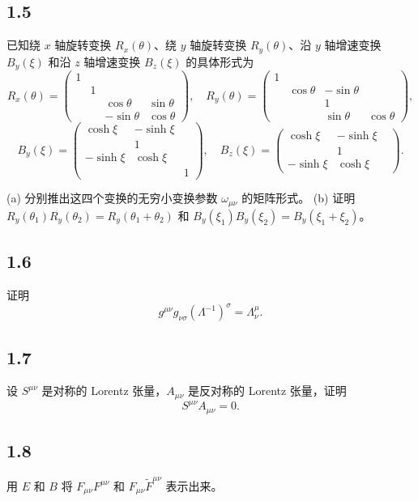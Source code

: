 \subsection{1.5}
已知绕 $x$ 轴旋转变换 $R_x(\theta)$、绕 $y$ 轴旋转变换 $R_y(\theta)$、沿 $y$ 轴增速变换 $B_y(\xi)$ 和沿 $z$ 轴增速变换 $B_z(\xi)$ 的具体形式为
$$R_x(\theta) =
\begin{pmatrix}
1 & & \\
& 1 & \\
& & \cos\theta & \sin\theta \\
& & -\sin\theta & \cos\theta 
\end{pmatrix},
\quad R_y(\theta) =
\begin{pmatrix}
1 & & \\
& \cos\theta & -\sin\theta \\
& & 1 \\
& & \sin\theta & \cos\theta 
\end{pmatrix},$$
$$B_y(\xi) =
\begin{pmatrix}
\cosh\xi & -\sinh\xi \\
& 1 & \\
-\sinh\xi & \cosh\xi \\
& & 1 
\end{pmatrix},
\quad B_z(\xi) =
\begin{pmatrix}
\cosh\xi & -\sinh\xi \\
& 1 & \\
-\sinh\xi & \cosh\xi 
\end{pmatrix}.$$

(a) 分别推出这四个变换的无穷小变换参数 $\omega_{\mu\nu}$ 的矩阵形式。
(b) 证明 $R_y(\theta_1)R_y(\theta_2) = R_y(\theta_1 + \theta_2)$ 和 $B_y(\xi_1)B_y(\xi_2) = B_y(\xi_1 + \xi_2)$。

\newpage
\subsection{1.6}
证明
$$g^{\mu\nu} g_{\nu\sigma}(\Lambda^{-1})^\sigma = \Lambda^\mu_\nu.$$

\newpage
\subsection{1.7}
设 $S^{\mu\nu}$ 是对称的 Lorentz 张量，$A_{\mu\nu}$ 是反对称的 Lorentz 张量，证明
$$S^{\mu\nu} A_{\mu\nu} = 0.$$

\newpage
\subsection{1.8}
用 $E$ 和 $B$ 将 $F_{\mu\nu}F^{\mu\nu}$ 和 $F_{\mu\nu}\tilde{F}^{\mu\nu}$ 表示出来。

